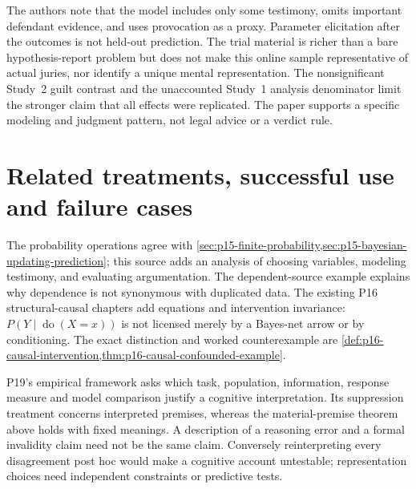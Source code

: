 The authors note that the model includes only some testimony, omits
important defendant evidence, and uses provocation as a proxy. Parameter
elicitation after the outcomes is not held-out prediction. The trial
material is richer than a bare hypothesis-report problem but does not
make this online sample representative of actual juries, nor identify
a unique mental representation. The nonsignificant Study~2 guilt contrast
and the unaccounted Study~1 analysis denominator limit the stronger
claim that all effects were replicated. The paper supports a specific
modeling and judgment pattern, not legal advice or a verdict rule.

\section{Related treatments, successful use and failure cases}
\label{sec:p16-rat42-comparisons-and-use}

The probability operations agree with
\cref{sec:p15-finite-probability,sec:p15-bayesian-updating-prediction};
this source adds an analysis of choosing variables, modeling testimony,
and evaluating argumentation. The dependent-source example explains
why dependence is not synonymous with duplicated data. The existing
P16 structural-causal chapters add equations and intervention invariance:
\(P(Y\mid\operatorname{do}(X=x))\) is not licensed merely by a
Bayes-net arrow or by conditioning. The exact distinction and worked
counterexample are
\cref{def:p16-causal-intervention,thm:p16-causal-confounded-example}.

P19's empirical framework asks which task, population, information,
response measure and model comparison justify a cognitive interpretation.
Its suppression treatment concerns interpreted premises, whereas the
material-premise theorem above holds with fixed meanings. A description
of a reasoning error and a formal invalidity claim need not be the same
claim. Conversely reinterpreting every disagreement post hoc would make
a cognitive account untestable; representation choices need independent
constraints or predictive tests.

